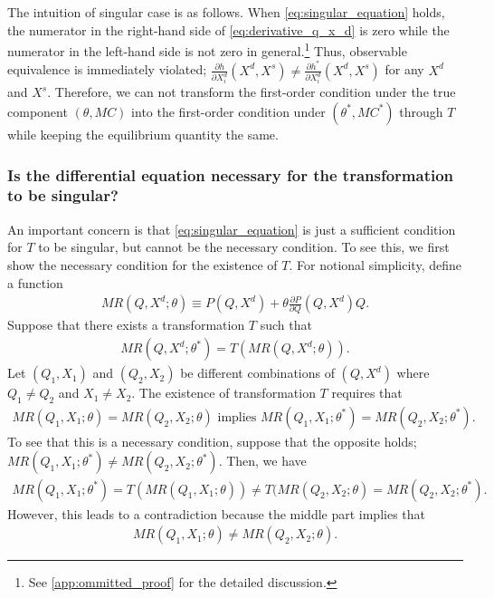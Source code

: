 \documentclass[11pt, a4paper]{article}
\theoremstyle{remark}
\begin{document}
The intuition of singular case is as follows.
When \eqref{eq:singular_equation} holds, the numerator in the right-hand side of \eqref{eq:derivative_q_x_d} is zero while the numerator in the left-hand side is not zero in general.\footnote{See \ref{app:ommitted_proof} for the detailed discussion.}
Thus, observable equivalence is immediately violated; $\frac{\partial h}{\partial X^{d}_{i}}(X^{d}, X^{s}) \neq \frac{\partial h^{*}}{\partial X^{d}_{i}}(X^{d}, X^{s})$ for any $X^{d}$ and $X^{s}$.
Therefore, we can not transform the first-order condition under the true component $(\theta, MC)$ into the first-order condition under $(\theta^*, MC^*)$ through $T$ while keeping the equilibrium quantity the same.

\subsubsection{Is the differential equation necessary for the transformation to be singular?}

An important concern is that \eqref{eq:singular_equation} is just a sufficient condition for $T$ to be singular, but cannot be the necessary condition.
To see this, we first show the necessary condition for the existence of $T$.
For notional simplicity, define a function
\begin{align}
    MR(Q, X^{d}; \theta) \equiv P(Q, X^d) + \theta \frac{\partial P}{\partial Q}(Q, X^d) Q.
\end{align}
Suppose that there exists a transformation $T$ such that
\begin{align}
    MR(Q, X^{d}; \theta^{*}) = T(MR(Q, X^{d}; \theta)).
\end{align}
Let $(Q_1, X_1)$ and $(Q_2, X_2)$ be different combinations of $(Q,X^{d})$ where $Q_1 \ne Q_2$ and $X_1 \ne X_2$.
The existence of transformation $T$ requires that
\begin{align}
    MR(Q_1, X_1; \theta) = MR(Q_2, X_2; \theta) \text{ implies } MR(Q_1, X_1; \theta^{*}) = MR(Q_2, X_2; \theta^{*}). \label{eq:existence_transformation}
\end{align}
To see that this is a necessary condition, suppose that the opposite holds; $MR(Q_1, X_1; \theta^{*}) \ne MR(Q_2, X_2; \theta^{*})$.
Then, we have
\begin{align}
    MR(Q_1, X_1; \theta^{*}) = T(MR(Q_1, X_1; \theta)) \ne T(MR(Q_2, X_2; \theta) = MR(Q_2, X_2; \theta^{*}).
\end{align}
However, this leads to a contradiction because the middle part implies that
\begin{align}
    MR(Q_1, X_1; \theta) \ne MR(Q_2, X_2; \theta).
\end{align}
\end{document}
